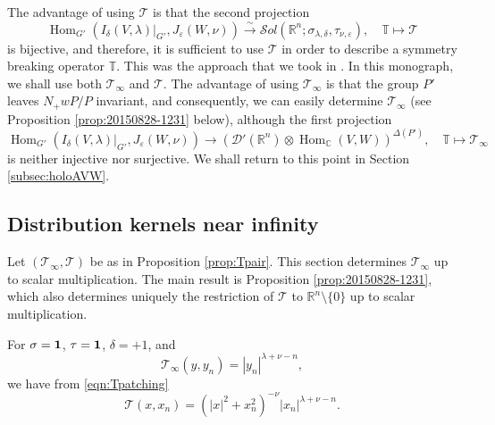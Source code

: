 \begin{remark}
\label{rem:7.5}
The advantage of using ${\mathcal{T}}$ is
 that the second projection
\[
 \operatorname{Hom}_{G'}
 (I_{\delta}(V,\lambda)|_{G'}, J_{\varepsilon}(W, \nu))
\overset \sim \to 
{\mathcal{S}}ol
({\mathbb{R}}^n;\sigma_{\lambda, \delta}, \tau_{\nu, \varepsilon}),
\quad
 {\mathbb{T}} \mapsto {\mathcal{T}}
\]
 is bijective, 
 and therefore, 
it is sufficient
 to use ${\mathcal{T}}$ 
 in order to describe a symmetry breaking operator ${\mathbb{T}}$.  
This was the approach 
 that we took in \cite{sbon}.  
In this monograph,
 we shall use both ${\mathcal{T}}_{\infty}$ and ${\mathcal{T}}$.  
The advantage of using ${\mathcal{T}}_{\infty}$ is
 that the group $P'$ leaves $N_+ w P/P$ invariant,
 and consequently,
 we can easily determine ${\mathcal{T}}_{\infty}$
 (see Proposition \ref{prop:20150828-1231} below), 
 although the first projection
\[
 \operatorname{Hom}_{G'}
 (I_{\delta}(V,\lambda)|_{G'}, J_{\varepsilon}(W, \nu))
\to 
 ({\mathcal{D}}'({\mathbb{R}}^n) \otimes \operatorname{Hom}_{{\mathbb{C}}}(V,W))^{\Delta(P')}, 
\quad
 {\mathbb{T}} \mapsto {\mathcal{T}}_{\infty}
\]
 is neither injective nor surjective.  
We shall return to this point
 in Section \ref{subsec:holoAVW}.  
\end{remark}



\subsection{Distribution kernels near infinity}
\label{subsec:infty}
Let $({\mathcal{T}}_{\infty}, {\mathcal{T}})$ be
 as in Proposition \ref{prop:Tpair}.  
This section determines ${\mathcal{T}}_{\infty}$ 
 up to scalar multiplication.  
The main result is Proposition \ref{prop:20150828-1231}, 
 which also determines uniquely the restriction of ${\mathcal{T}}$
 to ${\mathbb{R}}^n \setminus \{0\}$
 up to scalar multiplication.  

\begin{example}
\label{ex:152341}
For $\sigma = {\bf{1}}$, 
$\tau={\bf{1}}$, $\delta=+1$, and 
\[
   {\mathcal{T}}_{\infty}(y,y_n)=|y_n|^{\lambda+\nu-n}, 
\]
 we have from \eqref{eqn:Tpatching}
\[
   {\mathcal{T}}(x,x_n) = (|x|^2+x_n^2)^{-\nu} |x_n|^{\lambda+\nu-n}.  
\]
\end{example}



